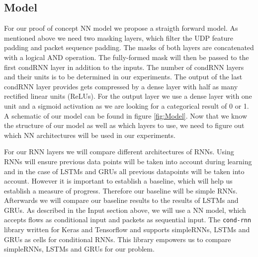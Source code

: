 \documentclass[
	ngerman,
	ruledheaders=section,%
	class=report,%
	thesis={type=bachelor},%
	accentcolor=9c,%
	custommargins=true,%
	marginpar=false,%
	parskip=half-,%
	fontsize=11pt,%
]{tudapub}
\let\code\texttt
\begin{document}



\subsection{Model}
\label{sec:NNmodel}

For our proof of concept NN model we propose a straigth forward model.
As mentioned above we need two masking layers, which filter the UDP feature padding and packet sequence padding.
The masks of both layers are concatenated with a logical AND operation.
The fully-formed mask will then be passed to the first condRNN layer in addition to the inputs.
The number of condRNN layers and their units is to be determined in our experiments.
The output of the last condRNN layer provides gets compressed by a dense layer with half as many rectified linear units (ReLUs).
For the output layer we use a dense layer with one unit and a sigmoid activation as we are looking for a categorical result of 0 or 1.
A schematic of our model can be found in figure \ref{fig:Model}.
Now that we know the structure of our model as well as which layers to use, we need to figure out which NN architectures will be used in our experiments.

For our RNN layers we will compare different architectures of RNNs.
Using RNNs will ensure previous data points will be taken into account during learning and in the case of LSTMs and GRUs all previous datapoints will be taken into account.
However it is important to establish a baseline, which will help us establish a measure of progress. %
Therefore our baseline will be simple RNNs.
Afterwards we will compare our baseline results to the results of LSTMs and GRUs.
As described in the Input section above, we will use a NN model, which accepts flows as conditional input and packets as sequential input.
The \code{cond-rnn} library \cite{remyPhilipperemyCondRnn2020} written for Keras and Tensorflow and supports simpleRNNs, LSTMs and GRUs as cells for conditional RNNs.
This library empowers us to compare simpleRNNs, LSTMs and GRUs for our problem.
\end{document}
